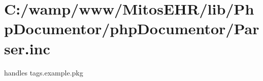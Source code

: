 \hypertarget{_c_1_2wamp_2www_2_mitos_e_h_r_2lib_2_php_documentor_2php_documentor_2_parser_8inc-example}{\section{\-C\-:/wamp/www/\-Mitos\-E\-H\-R/lib/\-Php\-Documentor/php\-Documentor/\-Parser.\-inc}
}
handles  tags.\-example.\-pkg


\begin{DoxyCodeInclude}
\end{DoxyCodeInclude}
 